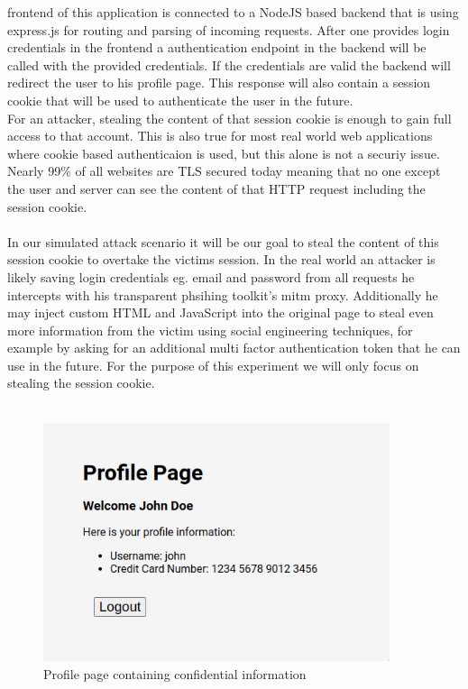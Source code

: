 \documentclass[12pt]{scrbook}
\begin{document}
frontend of this application is connected to a NodeJS based backend that is
using express.js for routing and parsing of incoming requests. After one
provides login credentials in the frontend a authentication endpoint in the
backend will be called with the provided credentials. If the credentials are
valid the backend will redirect the user to his profile page. This response will
also contain a session cookie that will be used to authenticate the user in the
future.\\For an attacker, stealing the content of that session cookie is enough
to gain full access to that account. This is also true for most real world web
applications where cookie based authenticaion is used, but this alone is not a
securiy issue. Nearly 99\% of all websites are TLS secured today
\cite{tlsPercentage} meaning that no one except the user and server can see the
content of that HTTP request including the session cookie.\\ \\

In our simulated attack scenario it will be our goal to steal the content of
this session cookie to overtake the victims session. In the real world an
attacker is likely saving login credentials eg. email and password from all
requests he intercepts with his transparent phsihing toolkit's mitm proxy.
Additionally he may inject custom HTML and JavaScript into the original page to
steal even more information from the victim using social engineering techniques,
for example by asking for an additional multi factor authentication token that
he can use in the future. For the purpose of this experiment we will only focus
on stealing the session cookie.\\ \\

\begin{figure}[!htb] \centering
  \includegraphics[height=7cm]{./images/profile_page.png} \caption{Profile page
containing confidential information} \end{figure}
\end{document}
